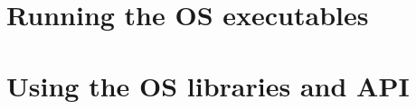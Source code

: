 \documentclass[11pt]{book}
\begin{document}





\throwpage



\throwpage






\throwpage


\part{Running the OS executables}




\throwpage



\throwpage



\throwpage



\throwpage





\throwpage


\part{Using the OS libraries and API}


%




\throwpage



\throwpage


\end{document}
